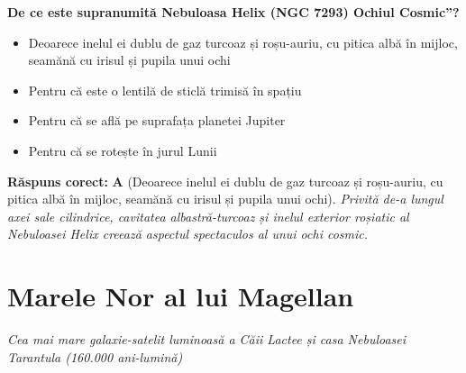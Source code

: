 \vspace{6pt}
\begin{tcolorbox}[orbitarquiz, title={\textbf{Întrebare de verificare \#70: Nebuloasa Helix (\quotedblbase{}Ochiul lui Dumnezeu\textquotedblright{}, NGC 7293)}}]
\textbf{De ce este supranumită Nebuloasa Helix (NGC 7293) \quotedblbase{}Ochiul Cosmic\textquotedblright{}?}
\begin{itemize}[leftmargin=2.2em, itemsep=2pt, topsep=4pt]
  \item[$\square$ \textbf{A.}] Deoarece inelul ei dublu de gaz turcoaz și roșu-auriu, cu pitica albă în mijloc, seamănă cu irisul și pupila unui ochi
  \item[$\square$ \textbf{B.}] Pentru că este o lentilă de sticlă trimisă în spațiu
  \item[$\square$ \textbf{C.}] Pentru că se află pe suprafața planetei Jupiter
  \item[$\square$ \textbf{D.}] Pentru că se rotește în jurul Lunii
\end{itemize}
\vspace{2pt}
{\footnotesize\color{orbitarMuted}\textbf{Răspuns corect:} \textbf{A} (Deoarece inelul ei dublu de gaz turcoaz și roșu-auriu, cu pitica albă în mijloc, seamănă cu irisul și pupila unui ochi). \emph{Privită de-a lungul axei sale cilindrice, cavitatea albastră-turcoaz și inelul exterior roșiatic al Nebuloasei Helix creează aspectul spectaculos al unui ochi cosmic.}}
\end{tcolorbox}
\clearpage


\section{Marele Nor al lui Magellan}
\label{sec:body-large_magellanic_cloud}
\vspace{-4pt}
{\large\itshape\color{orbitarAccent} Cea mai mare galaxie-satelit luminoasă a Căii Lactee și casa Nebuloasei Tarantula (160.000 ani-lumină)}\\[4pt]



